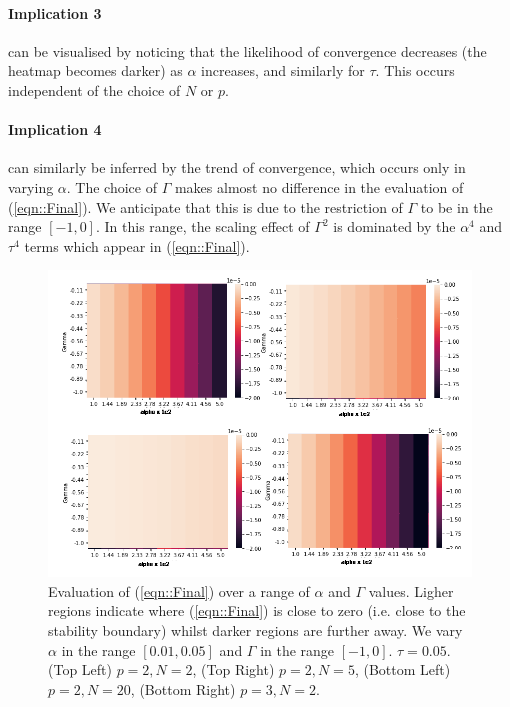 \documentclass[sigconf,anonymous]{aamas}
\begin{document}
\paragraph{Implication 3} can be visualised by noticing that the likelihood of convergence decreases (the heatmap becomes darker) as $\alpha$ increases, and similarly for $\tau$. This occurs independent of the choice of $N$ or $p$. 

\paragraph{Implication 4} can similarly be inferred by the trend of convergence, which occurs only in varying $\alpha$. The choice of $\Gamma$
makes almost no difference in the evaluation of (\ref{eqn::Final}). We
anticipate that this is due to the restriction of $\Gamma$ to be in
the range $[-1, 0]$. In this range, the scaling effect of $\Gamma^2$
is dominated by the $\alpha^4$ and $\tau^4$ terms which appear in
(\ref{eqn::Final}).

\begin{figure}[t]
    \includegraphics[width = 1.2 \linewidth, center]{Figures/Theory.png}
    \caption{Evaluation of (\ref{eqn::Final}) over a range of $\alpha$ and $\Gamma$ values. Ligher regions indicate where (\ref{eqn::Final}) is close to zero (i.e. close to the stability boundary) whilst darker regions are further away. We vary $\alpha$ in the range $[0.01, 0.05]$ and $\Gamma$ in the range $[-1, 0]$. $\tau = 0.05$. (Top Left) $p = 2, N = 2$, (Top Right) $p = 2, N = 5$, (Bottom Left) $p = 2, N = 20$, (Bottom Right) $p=3, N = 2$.}
    \label{fig:theory}
\end{figure}
\end{document}
